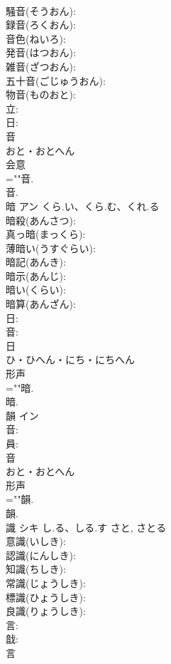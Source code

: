 \documentclass[8pt]{extreport}
\begin{document}
\begin{CJK}{UTF8}{min}
\\	騒音(そうおん): 
\\	録音(ろくおん): 
\\	音色(ねいろ): 
\\	発音(はつおん): 
\\	雑音(ざつおん): 
\\	五十音(ごじゅうおん): 
\\	物音(ものおと): 
\\	立: 
\\	日: 
\\	音	
\\	おと・おとへん	
\\	会意 
\\	=""音.
\\	音.
\\	暗	アン	くら.い、くら.む、くれ.る		
\\	暗殺(あんさつ): 
\\	真っ暗(まっくら): 
\\	薄暗い(うすぐらい): 
\\	暗記(あんき): 
\\	暗示(あんじ): 
\\	暗い(くらい): 
\\	暗算(あんざん): 
\\	日: 
\\	音: 
\\	日	
\\	ひ・ひへん・にち・にちへん	
\\	形声 
\\	=""暗.
\\	暗.
\\	韻	イン			
\\	音: 
\\	員: 
\\	音	
\\	おと・おとへん	
\\	形声 
\\	=""韻.
\\	韻.
\\	識	シキ	し.る、しる.す	さと, さとる	
\\	意識(いしき): 
\\	認識(にんしき): 
\\	知識(ちしき): 
\\	常識(じょうしき): 
\\	標識(ひょうしき): 
\\	良識(りょうしき): 
\\	言: 
\\	戠: 
\\	言	

\end{CJK}
\end{document}
